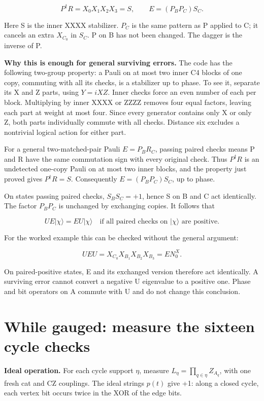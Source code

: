 \documentclass[11pt]{article}
\begin{document}
\[
P^\dagger R=X_0X_1X_2X_3=S,\qquad
E=(P_BP_C)S_C.
\]

Here S is the inner XXXX stabilizer. \(P_C\) is the same pattern as P applied to C; it cancels an extra \(X_{C_0}\) in \(S_C\). P on B has not been changed. The dagger is the inverse of P.

\textbf{Why this is enough for general surviving errors.} The code has the following two-group property: a Pauli on at most two inner C4 blocks of one copy, commuting with all its checks, is a stabilizer up to phase. To see it, separate its X and Z parts, using \(Y=iXZ\). Inner checks force an even number of each per block. Multiplying by inner XXXX or ZZZZ removes four equal factors, leaving each part at weight at most four. Since every generator contains only X or only Z, both parts individually commute with all checks. Distance six excludes a nontrivial logical action for either part.

For a general two-matched-pair Pauli \(E=P_BR_C\), passing paired checks means P and R have the same commutation sign with every original check. Thus \(P^\dagger R\) is an undetected one-copy Pauli on at most two inner blocks, and the property just proved gives \(P^\dagger R=S\). Consequently \(E=(P_BP_C)S_C\), up to phase.

On states passing paired checks, \(S_BS_C=+1\), hence S on B and C act identically. The factor \(P_BP_C\) is unchanged by exchanging copies. It follows that

\[
UE|\chi\rangle=EU|\chi\rangle
\quad\text{if all paired checks on }|\chi\rangle\text{ are positive}.
\]

For the worked example this can be checked without the general argument:

\[
UEU=X_{C_0}X_{B_1}X_{B_2}X_{B_3}=E N_0^X.
\]

On paired-positive states, E and its exchanged version therefore act identically. A surviving error cannot convert a negative U eigenvalue to a positive one. Phase and bit operators on A commute with U and do not change this conclusion.

\section{While gauged: measure the sixteen cycle checks}
\textbf{Ideal operation.} For each cycle support \(\eta\), measure \(L_\eta=\prod_{q\in\eta}Z_{A_q}\), with one fresh cat and CZ couplings. The ideal strings \(p(t)\) give +1: along a closed cycle, each vertex bit occurs twice in the XOR of the edge bits.
\end{document}
